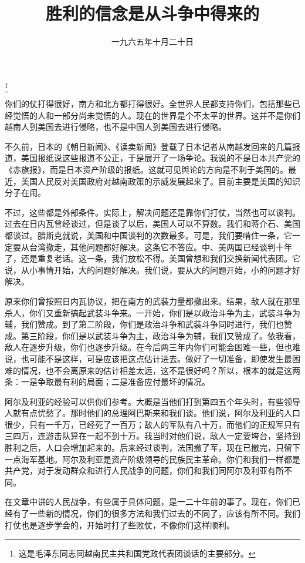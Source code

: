 
\title{胜利的信念是从斗争中得来的}
\date{一九六五年十月二十日}
\thanks{这是毛泽东同志同越南民主共和国党政代表团谈话的主要部分。}
\maketitle


你们的仗打得很好，南方和北方都打得很好。全世界人民都支持你们，包括那些已经觉悟的人和一部分尚未觉悟的人。现在的世界是个不太平的世界。这并不是你们越南人到美国去进行侵略，也不是中国人到美国去进行侵略。

不久前，日本的《朝日新闻》、《读卖新闻》登载了日本记者从南越发回来的几篇报道，美国报纸说这些报道不公正，于是展开了一场争论。我说的不是日本共产党的《赤旗报》，而是日本资产阶级的报纸。这就可见舆论的方向是不利于美国的。最近，美国人民反对美国政府对越南政策的示威发展起来了。目前主要是美国的知识分子在闹。

不过，这些都是外部条件。实际上，解决问题还是靠你们打仗，当然也可以谈判。过去在日内瓦曾经谈过，但是谈了以后，美国人可以不算数。我们和蒋介石、美国都谈过。腊斯克就说，美国和中国谈判的次数最多。可是，我们要啃住一条，它一定要从台湾撤走，其他问题都好解决。这条它不答应。中、美两国已经谈判十年了，还是重复老话。这一条，我们放松不得。美国曾想和我们交换新闻代表团。它说，从小事情开始，大的问题好解决。我们说，要从大的问题开始，小的问题才好解决。

原来你们曾按照日内瓦协议，把在南方的武装力量都撤出来。结果，敌人就在那里杀人，你们又重新搞起武装斗争来。一开始，你们是以政治斗争为主，武装斗争为辅，我们赞成。到了第二阶段，你们是政治斗争和武装斗争同时进行，我们也赞成。第三阶段，你们是以武装斗争为主，政治斗争为辅，我们又赞成了。依我看，敌人在逐步升级，你们也逐步升级。在今后两三年内你们可能会困难一些，但也难说，也可能不是这样，可是应该把这点估计进去。做好了一切准备，即使发生最困难的情况，也不会离原来的估计相差太远，这不是很好吗？所以，根本的就是这两条：一是争取最有利的局面；二是准备应付最坏的情况。

阿尔及利亚的经验可以供你们参考。大概是当他们打到第四五个年头时，有些领导人就有点忧愁了。那时他们的总理阿巴斯来和我们谈。他们说，阿尔及利亚的人口很少，只有一千万，已经死了一百万；敌人的军队有八十万，而他们的正规军只有三四万，连游击队算在一起不到十万。我当时对他们说，敌人一定要垮台，坚持到胜利之后，人口会增加起来的。后来经过谈判，法国撤了军，现在已撤完，只留下一点海军基地。阿尔及利亚是资产阶级领导的民族民主革命。你们和我们一样都是共产党，对于发动群众和进行人民战争的问题，你们和我们同阿尔及利亚有所不同。

在文章中讲的人民战争，有些属于具体问题，是一二十年前的事了。现在，你们已经有了一些新的情况，你们的很多方法和我们过去的不同了，应该有所不同。我们打仗也是逐步学会的，开始时打了些败仗，不像你们这样顺利。

